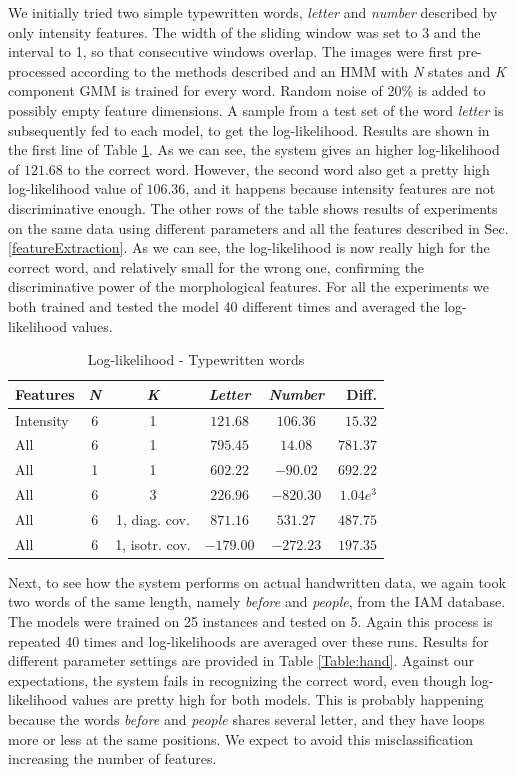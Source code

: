 \documentclass[conference]{IEEEtran}
\begin{document}
We initially tried two simple typewritten words, {\it letter} and {\it number } described by only intensity features. The width of the sliding window was set to 3 and the interval to 1, so that consecutive windows overlap. The images were first pre-processed according to the methods described and an HMM with {\it N} states and {\it K} component GMM is trained for every word. Random noise of 20\% is added to possibly empty feature dimensions. A sample from a test set of the word {\it letter} is subsequently fed to each model, to get the log-likelihood. Results are shown in the first line of Table \ref{Table:1vs1-1}. As we can see, the system gives an higher log-likelihood of $121.68$  to the correct word. However, the second word also get a pretty high log-likelihood value of $106.36$, and it happens because intensity features are not discriminative enough. The other rows of the table shows results of experiments on the same data using different parameters and all the features described in Sec. \ref{featureExtraction}. As we can see, the log-likelihood is now really high for the correct word, and relatively small for the wrong one, confirming the discriminative power of the morphological features.
For all the experiments we both trained and tested the model 40 different times and averaged the log-likelihood values.
\begin{table}[H]
 \caption{Log-likelihood - Typewritten words}
 \label{Table:1vs1-1}
  \begin{tabular}{|l|c|c|c|c|r|}\hline
    Features 	& {\it N} 	& {\it K} 			& {\it Letter}	& {\it Number} 	& Diff. 	\\\hline
    Intensity 	& 6	& 1 			& $121.68$ 	& $106.36$ 	& $15.32$	\\
    All		& 6  	& 1 			& $795.45$ 	& $14.08$  	& $781.37$	\\
    All 	& 1	& 1 			& $602.22$ 	& $-90.02$ 	& $692.22$	\\
    All 	& 6 	& 3 			& $226.96$ 	& $-820.30$ 	& $1.04e^{3}$	\\
    All 	& 6 	& 1,  diag. cov. 	& $871.16$ 	& $531.27$ 	& $487.75$	\\
    All 	& 6 	& 1,  isotr. cov. 	& $-179.00$ 	& $-272.23$ 	& $197.35$	\\\hline
\end{tabular}
\end{table}

Next, to see how the system performs on actual handwritten data, we again took two words of the same length, namely {\it before} and {\it people}, from the IAM database. The models were trained on 25 instances and tested on 5. Again this process is repeated 40 times and log-likelihoods are averaged over these runs. Results for different parameter settings are provided in Table \ref{Table:hand}. Against our expectations, the system fails in recognizing the correct word, even though log-likelihood values are pretty high for both models. This is probably happening because the words  {\it before} and  {\it people} shares several letter, and they have loops more or less at the same positions. We expect to avoid this misclassification increasing the number of features.
\end{document}
